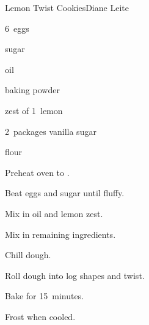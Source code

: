 \begin{recipe}{Lemon Twist Cookies}{Diane Leite}{}

\begin{ingredients}
\item 6~eggs
\item {} sugar
\item {} oil
\item {} baking powder
\item zest of 1~lemon
\item 2~packages vanilla sugar
\item {} flour
\end{ingredients}

\begin{directions}
\item Preheat oven to .
\item Beat eggs and sugar until fluffy.
\item Mix in oil and lemon zest.
\item Mix in remaining ingredients.
\item Chill dough.
\item Roll dough into log shapes and twist.
\item Bake for 15~minutes.
\item Frost when cooled.
\end{directions}

\end{recipe}
